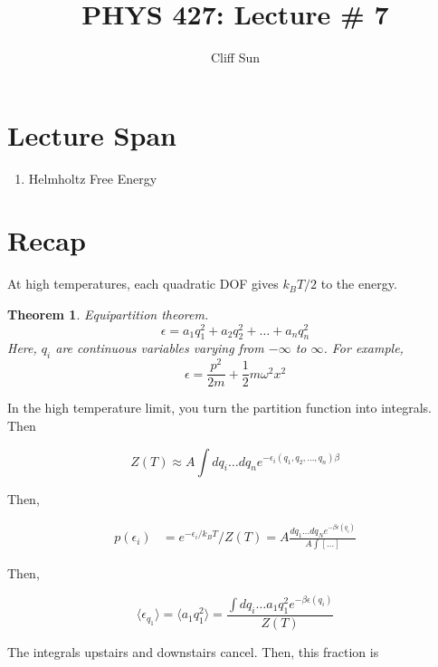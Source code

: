 \documentclass{article}
\title{PHYS 427: Lecture \# 7}
\author{Cliff Sun}
\newtheorem{theorem}{Theorem}[section]
\newtheorem{one minute paper}[theorem]{One Minute Paper}
\begin{document}
\maketitle

\section*{Lecture Span}
\begin{enumerate}
    \item Helmholtz Free Energy
\end{enumerate}

\section*{Recap}

At high temperatures, each quadratic DOF gives $k_B T /2$ to the energy. 

\begin{theorem}
    Equipartition theorem. 
    \begin{equation}
        \epsilon = a_1 q_1^2 + a_2 q_2^2 + \dots + a_n q_n^2
    \end{equation}
    Here, $q_i$ are continuous variables varying from $-\infty$ to $\infty$. For example, 
    \begin{equation}
        \epsilon = \frac{p^2}{2m} + \frac{1}{2}m \omega^2 x^2
    \end{equation}
\end{theorem}

In the high temperature limit, you turn the partition function into integrals. Then 

\begin{equation}
    Z(T) \approx A\int dq_i \dots dq_n e^{-\epsilon_i(q_1,q_2,\dots,q_n)\beta}
\end{equation}

Then, 

\begin{align}
    p(\epsilon_i) &= e^{-\epsilon_i/k_B T}/Z(T) = A \frac{dq_1 \dots dq_N e^{-\beta \epsilon(q_i)}}{A \int [\dots]}
\end{align}

Then, 

\begin{equation}
    \langle \epsilon_{q_1} \rangle = \langle a_1 q_1^2 \rangle = \frac{\int dq_{i}\dots a_1q_1^2 e^{-\beta \epsilon(q_i)}}{Z(T)}
\end{equation}

The integrals upstairs and downstairs cancel. Then, this fraction is
\end{document}
